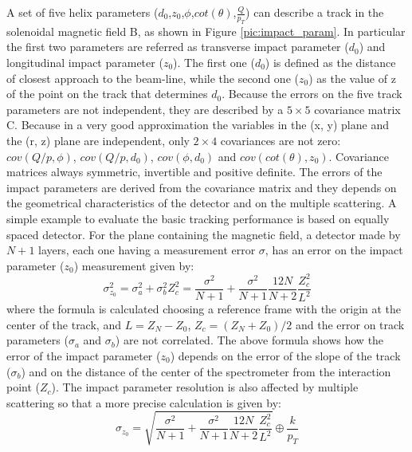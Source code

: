 A set of five helix parameters ($d_0$,$z_0$,$\phi$,$cot(\theta)$,$\frac{Q}{p_T}$) can describe a track in the solenoidal magnetic field B, as shown in Figure \ref{pic:impact_param}.
In particular the first two parameters are referred as transverse impact parameter ($d_0$) and longitudinal impact parameter ($z_0$).
The first one ($d_0$) is defined as the distance of closest approach to the beam-line, while the second one ($z_0$) as the value of z of the point on the track that determines $d_0$.
Because the errors on the five track parameters are not independent, they are described by a $5\times5$ covariance matrix C.
Because in a very good approximation the variables in the (x, y) plane and the (r, z) plane are independent, only $2\times4$ covariances are not zero: $cov(Q/p , \phi )$, $cov(Q/p , d_0)$, $cov(\phi , d_0)$ and $cov(cot(\theta), z_0)$. Covariance matrices always symmetric, invertible and positive definite.
The errors of the impact parameters are derived from the covariance matrix and they depends on the geometrical characteristics of the detector and on the multiple scattering.
A simple example to evaluate the basic tracking performance is based on equally spaced detector.
For the plane containing the magnetic field, a detector made by $N+1$ layers, each one having a measurement error $\sigma$, has an error on the impact parameter ($z_0$) measurement given by:
\begin{equation}
\sigma_{z_0}^2 = \sigma_a^2 +\sigma_b^2 Z_c^2 = \frac{\sigma^2}{N+1} +\frac{\sigma^2}{N+1} \frac{12N}{N+2}\frac{Z_c^2}{L^2}
\end{equation}
where the formula is calculated choosing a reference frame with the origin at the center of the track, and $L=Z_N-Z_0$, $Z_c = (Z_N+Z_0)/2$ and the error on track parameters ($\sigma_a$ and $\sigma_b$) are not correlated.
The above formula shows how the error of the impact parameter ($z_0$) depends on the error of the slope of the track ($\sigma_b$) and on the distance of the center of the spectrometer from the interaction point ($Z_c$).
The impact parameter resolution is also affected by multiple scattering so that a more precise calculation is given by:
\begin{equation}
\sigma_{z_0} =\sqrt{ \frac{\sigma^2}{N+1} +\frac{\sigma^2}{N+1} \frac{12N}{N+2}\frac{Z_c^2}{L^2}} \oplus \frac{k}{p_T} 
\end{equation}
